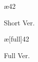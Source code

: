 \documentclass{ltjsarticle}
\begin{document}
\begin{figure}[H]
  \ae{4}{2}
  \caption{Short Ver.}
\end{figure}
\begin{figure}[H]
  \ae[full]{4}{2}
  \caption{Full Ver.}
\end{figure}
\end{document}
